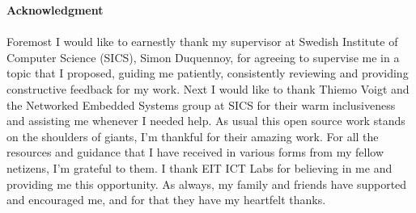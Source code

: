 
\clearpage

%

\newpage\null\thispagestyle{empty}\newpage

\thispagestyle{plain}
{}
\huge{\textbf{Acknowledgment}} \\
\normalsize \\


Foremost I would like to earnestly thank my supervisor at Swedish Institute of Computer Science (SICS), Simon Duquennoy, for agreeing to supervise me in a topic that I proposed, guiding me patiently, consistently reviewing and providing constructive feedback for my work. Next I would like to thank Thiemo Voigt and the Networked Embedded Systems group at SICS for their warm inclusiveness and assisting me whenever I needed help. As usual this open source work stands on the shoulders of giants, I'm thankful for their amazing work. For all the resources and guidance that I have received in various forms from my fellow netizens, I'm grateful to them. I thank EIT ICT Labs for believing in me and providing me this opportunity. As always, my family and friends have supported and encouraged me, and for that they have my heartfelt thanks.
\clearpage

\newpage\null\thispagestyle{empty}\newpage

\tableofcontents
\null
\vfill



